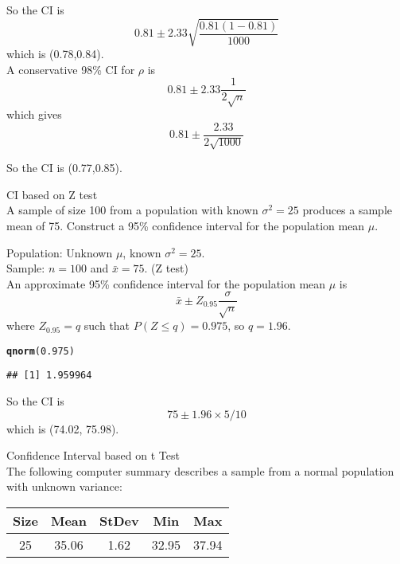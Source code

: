 \documentclass[bigtut]{tutorial}\usepackage[]{graphicx}\usepackage[]{color}
\makeatletter
\newcommand{\hlnum}[1]{\textcolor[rgb]{0.686,0.059,0.569}{#1}}%
\newcommand{\hlstd}[1]{\textcolor[rgb]{0.345,0.345,0.345}{#1}}%
\newcommand{\hlkwd}[1]{\textcolor[rgb]{0.737,0.353,0.396}{\textbf{#1}}}%
\newenvironment{kframe}{%
 \def\at@end@of@kframe{}%
 \ifinner\ifhmode%
  \def\at@end@of@kframe{\end{minipage}}%
  \begin{minipage}{\columnwidth}%
 \fi\fi%
 \def\FrameCommand##1{\hskip\@totalleftmargin \hskip-\fboxsep
 \colorbox{shadecolor}{##1}\hskip-\fboxsep
     \hskip-\linewidth \hskip-\@totalleftmargin \hskip\columnwidth}%
 \MakeFramed {\advance\hsize-\width
   \@totalleftmargin\z@ \linewidth\hsize
   \@setminipage}}%
 {\par\unskip\endMakeFramed%
 \at@end@of@kframe}
\newenvironment{knitrout}{}{} %
\makeatother
\begin{document}
\begin{tutorial}
\begin{questions}
\begin{solution}
So the CI is
\[ 0.81 \pm 2.33 \sqrt{  \frac{ 0.81 (1 - 0.81) }{1000} } \]
which is (0.78,0.84). \\

\vspace{0.5cm}
A conservative 98\% CI for $\rho$ is
\[ 0.81 \pm   2.33 \frac{ 1 }{ 2 \sqrt{n}}  \]
which gives
\[ 0.81 \pm   \frac{ 2.33 }{ 2 
\sqrt{1000} } \]

So the CI is (0.77,0.85).
\end{solution}




\question CI based on Z test \\

A sample of size 100 from a population with known
$\sigma^2=25$ produces a sample mean of 75. Construct a
95\% confidence interval for the population
mean $\mu$.

\begin{solution}
Population: Unknown $\mu$, known $\sigma^2=25$. \\
Sample: $n=100$ and $\bar{x} = 75$. (Z test) \\

An approximate 95\% confidence interval for the population mean $\mu$ is
\[
\bar x \pm Z_{0.95}  \frac{ \sigma }{ \sqrt{n}}
\]
where $Z_{0.95} = q$ such that $P(Z \leq q) = 0.975$, so $q=1.96$. \\

\begin{knitrout}
\color{fgcolor}\begin{kframe}
\begin{alltt}
\hlkwd{qnorm}\hlstd{(}\hlnum{0.975}\hlstd{)}
\end{alltt}
\begin{verbatim}
## [1] 1.959964
\end{verbatim}
\end{kframe}
\end{knitrout}

So the CI is 
\[ 75 \pm 1.96 \times 5/10\]
which is (74.02, 75.98).

\end{solution}



\question Confidence Interval based on t Test   \\

 The following computer summary describes a sample from a normal population with unknown variance:
  \begin{center}
    \begin{tabular}{ccccc}
       Size&Mean&StDev&Min&Max\\ \hline
       25&35.06&1.62&32.95&37.94
   \end{tabular}
        \end{center}


\end{questions}
\end{tutorial}
\end{document}
